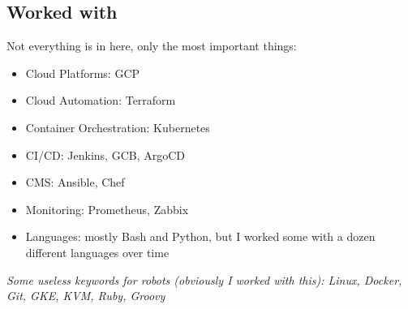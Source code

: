 \documentclass[11pt, a4paper]{article}
\newcommand{\Delimitline}{
  \vspace{-2ex}
  \noindent\makebox[\linewidth]{\rule{\DelimitlineLength}{0.12ex}} }
\begin{document}
\vspace{0ex}


\subsection*{Worked with}
\Delimitline

Not everything is in here, only the most important things:
\begin{itemize}
  \item Cloud Platforms: GCP
  \item Cloud Automation: Terraform
  \item Container Orchestration: Kubernetes
  \item CI/CD: Jenkins, GCB, ArgoCD
  \item CMS: Ansible, Chef
  \item Monitoring: Prometheus, Zabbix
  \item Languages: mostly Bash and Python, but I worked some with a dozen different languages over time
\end{itemize}\vspace{2ex}

\textit{Some useless keywords for robots (obviously I worked with this): Linux, Docker, Git, GKE, KVM, Ruby, Groovy}
\end{document}
